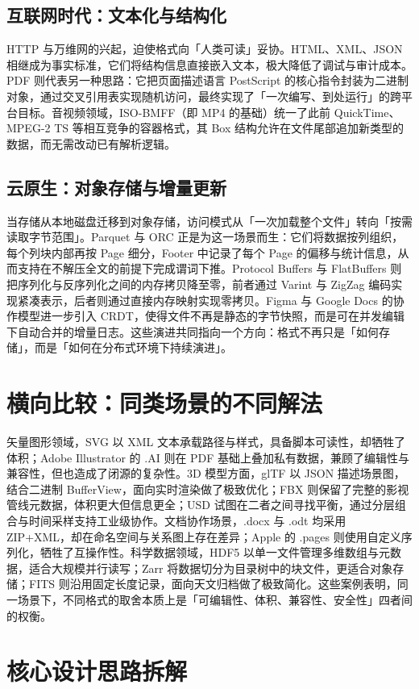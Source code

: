 \section{互联网时代：文本化与结构化}
HTTP 与万维网的兴起，迫使格式向「人类可读」妥协。HTML、XML、JSON 相继成为事实标准，它们将结构信息直接嵌入文本，极大降低了调试与审计成本。PDF 则代表另一种思路：它把页面描述语言 PostScript 的核心指令封装为二进制对象，通过交叉引用表实现随机访问，最终实现了「一次编写、到处运行」的跨平台目标。音视频领域，ISO-BMFF（即 MP4 的基础）统一了此前 QuickTime、MPEG-2 TS 等相互竞争的容器格式，其 Box 结构允许在文件尾部追加新类型的数据，而无需改动已有解析逻辑。\par
\section{云原生：对象存储与增量更新}
当存储从本地磁盘迁移到对象存储，访问模式从「一次加载整个文件」转向「按需读取字节范围」。Parquet 与 ORC 正是为这一场景而生：它们将数据按列组织，每个列块内部再按 Page 细分，Footer 中记录了每个 Page 的偏移与统计信息，从而支持在不解压全文的前提下完成谓词下推。Protocol Buffers 与 FlatBuffers 则把序列化与反序列化之间的内存拷贝降至零，前者通过 Varint 与 ZigZag 编码实现紧凑表示，后者则通过直接内存映射实现零拷贝。Figma 与 Google Docs 的协作模型进一步引入 CRDT，使得文件不再是静态的字节快照，而是可在并发编辑下自动合并的增量日志。这些演进共同指向一个方向：格式不再只是「如何存储」，而是「如何在分布式环境下持续演进」。\par
\chapter{横向比较：同类场景的不同解法}
矢量图形领域，SVG 以 XML 文本承载路径与样式，具备脚本可读性，却牺牲了体积；Adobe Illustrator 的 .AI 则在 PDF 基础上叠加私有数据，兼顾了编辑性与兼容性，但也造成了闭源的复杂性。3D 模型方面，glTF 以 JSON 描述场景图，结合二进制 BufferView，面向实时渲染做了极致优化；FBX 则保留了完整的影视管线元数据，体积更大但信息更全；USD 试图在二者之间寻找平衡，通过分层组合与时间采样支持工业级协作。文档协作场景，.docx 与 .odt 均采用 ZIP+XML，却在命名空间与关系图上存在差异；Apple 的 .pages 则使用自定义序列化，牺牲了互操作性。科学数据领域，HDF5 以单一文件管理多维数组与元数据，适合大规模并行读写；Zarr 将数据切分为目录树中的块文件，更适合对象存储；FITS 则沿用固定长度记录，面向天文归档做了极致简化。这些案例表明，同一场景下，不同格式的取舍本质上是「可编辑性、体积、兼容性、安全性」四者间的权衡。\par
\chapter{核心设计思路拆解}
